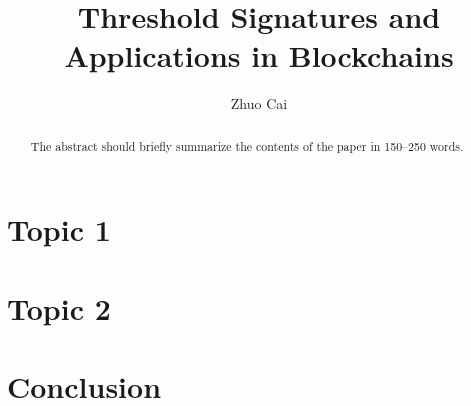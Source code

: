 \documentclass[runningheads]{llncs}
\begin{document}
%
\title{Threshold Signatures and Applications in Blockchains}
%
%
\author{Zhuo Cai}
%
%
%
\maketitle              %
%
\begin{abstract}
The abstract should briefly summarize the contents of the paper in
150--250 words.
\end{abstract}
%
%

\tableofcontents












\section{Topic 1}


\section{Topic 2}


\section{Conclusion}




\newpage



\end{document}
